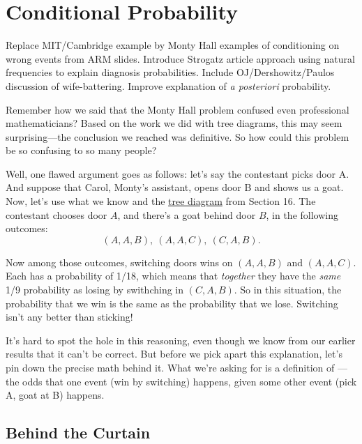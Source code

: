 \chapter{Conditional Probability}\label{chap:cond_prob} %

\begin{editingnotes}
 Replace MIT/Cambridge example by Monty Hall
examples of conditioning on wrong events from ARM slides.  Introduce
Strogatz article approach using natural frequencies to explain
diagnosis probabilities.  Include OJ/Dershowitz/Paulos discussion of
wife-battering.  Improve explanation of \emph{a posteriori}
probability.
\end{editingnotes}

Remember how we said that the Monty Hall problem confused even
professional mathematicians?  Based on the work we did with tree
diagrams, this may seem surprising—the conclusion we reached was
definitive.  So how could this problem be so confusing to so many
people?  

Well, one flawed argument goes as follows: let’s say the contestant
picks door A.  And suppose that Carol, Monty’s assistant, opens door B
and shows us a goat.  Now, let’s use what we know and the \href{}{tree
  diagram} from Section 16.  The contestant chooses door $A$, and
there’s a goat behind door $B$, in the following outcomes:
\[
(A, A, B),\ (A, A, C),\ (C, A, B).
\]

Now among those outcomes, switching doors wins on $(A, A, B)$ and $(A,
A, C)$.  Each has a probability of 1/18, which means that
\emph{together} they have the \emph{same} 1/9 probability as losing by
swithching in $(C, A, B)$.  So in this situation, the probability that
we win is the same as the probability that we lose.  Switching isn't
any better than sticking!

It’s hard to spot the hole in this reasoning, even though we know from
our earlier results that it can’t be correct.  But before we pick
apart this explanation, let's pin down the precise math behind it.
What we’re asking for is a definition of —the odds that one event (win by switching) happens,
given some other event (pick A, goat at B) happens.

\section{Behind the Curtain}

